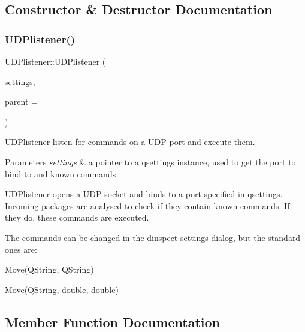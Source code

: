 \subsection{Constructor \& Destructor Documentation}
\mbox{\label{classUDPlistener_a789cb6a7b7347a2df5cdc85a457bde4a}} 
\subsubsection{\texorpdfstring{U\+D\+Plistener()}{UDPlistener()}}
{\footnotesize\ttfamily U\+D\+Plistener\+::\+U\+D\+Plistener (\begin{DoxyParamCaption}\item[{Q\+Settings $\ast$}]{settings,  }\item[{Q\+Object $\ast$}]{parent = {} }\end{DoxyParamCaption})\hspace{0.3cm}{\ttfamily [explicit]}}



\hyperlink{classUDPlistener}{U\+D\+Plistener} listen for commands on a U\+DP port and execute them. 


\begin{DoxyParams}{Parameters}
{\em settings} & a pointer to a qsettings instance, used to get the port to bind to and known commands\\
\hline
\end{DoxyParams}
\hyperlink{classUDPlistener}{U\+D\+Plistener} opens a U\+DP socket and binds to a port specified in qsettings. Incoming packages are analysed to check if they contain known commands. If they do, these commands are executed.

The commands can be changed in the dinspect settings dialog, but the standard ones are\+:
\begin{DoxyItemize}
\item Move(\+Q\+String, Q\+String)
\item \hyperlink{classUDPlistener_a03cb7a923fb064f41395f8db9409e511}{Move(\+Q\+String, double, double)} 
\end{DoxyItemize}

\subsection{Member Function Documentation}
\mbox{\label{classUDPlistener_a4b7a056403f9b80485c92b82c340109a}} 
